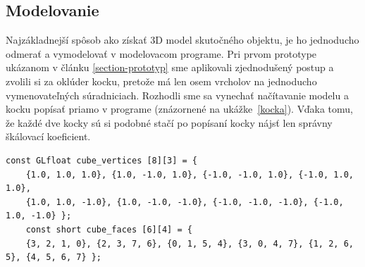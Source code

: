 \subsection{Modelovanie}

Najzákladnejší spôsob ako získať 3D model skutočného objektu, je ho jednoducho odmerať a vymodelovať v modelovacom programe. Pri prvom prototype ukázanom v článku \ref{section-prototyp} sme aplikovali zjednodušený postup a zvolili si za oklúder kocku, pretože má len osem vrcholov na jednoducho vymenovateľných súradniciach. Rozhodli sme sa vynechať načítavanie modelu a kocku popísať priamo v programe (znázornené na ukážke~\ref{kocka}). Vďaka tomu, že každé dve kocky sú si podobné stačí po popísaní kocky nájsť len správny škálovací koeficient.


\begin{lstlisting}[label={kocka}]
	const GLfloat cube_vertices [8][3] = {
	{1.0, 1.0, 1.0}, {1.0, -1.0, 1.0}, {-1.0, -1.0, 1.0}, {-1.0, 1.0, 1.0},
	{1.0, 1.0, -1.0}, {1.0, -1.0, -1.0}, {-1.0, -1.0, -1.0}, {-1.0, 1.0, -1.0} };
	const short cube_faces [6][4] = {
	{3, 2, 1, 0}, {2, 3, 7, 6}, {0, 1, 5, 4}, {3, 0, 4, 7}, {1, 2, 6, 5}, {4, 5, 6, 7} };
\end{lstlisting}

